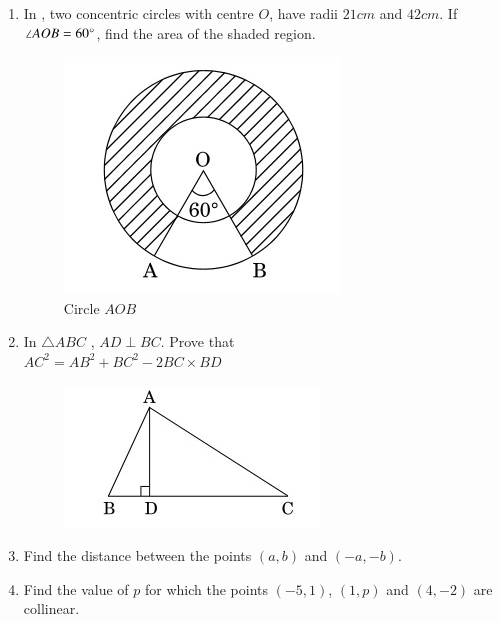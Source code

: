 \documentclass[2pt,-letter paper]{article}
\providecommand{\brak}[1]{\ensuremath{\left(#1\right)}}
\begin{document}
\begin{enumerate}
\item In , two concentric circles with centre $O$, have radii $21 cm$ and $42 cm$. If $\angle AOB = 60\degree$, find the area of the shaded region.
\begin{figure}[H]
    \centering
    \includegraphics[width=\columnwidth]{figs/img2.jpg}
    \caption{Circle $AOB$ }
    \label{fig: Fig_1}
\end{figure}
\item In $\triangle ABC$ , $AD \perp BC$. Prove that\\
$AC^2 = AB^2 + BC^2 - 2BC \times BD $
\begin{figure}[H]
    \centering
    \includegraphics[width=\columnwidth]{figs/img3.jpg}
    \caption{}
    \label{fig:Fig_2}
\end{figure}
\item Find the distance between the points $\brak{a, b}$ and $\brak{-a, -b}$.
\item Find the value of $p$ for which the points $\brak{-5, 1}$, $\brak{1, p}$ and $\brak{4, -2}$ are collinear.



\end{enumerate}
\end{document}
